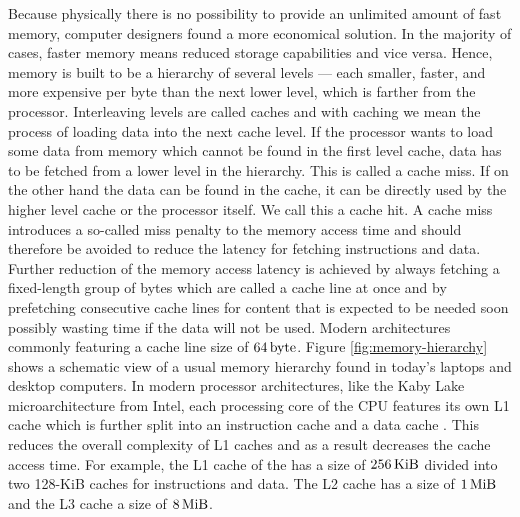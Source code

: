 \documentclass{stdlocal}
\begin{document}
    Because physically there is no possibility to provide an unlimited amount of fast memory, computer designers found a more economical solution.
    In the majority of cases, faster memory means reduced storage capabilities and vice versa.
    Hence, memory is built to be a hierarchy of several levels --- each smaller, faster, and more expensive per byte than the next lower level, which is farther from the processor.
    Interleaving levels are called caches and with caching we mean the process of loading data into the next cache level.
    If the processor wants to load some data from memory which cannot be found in the first level cache, data has to be fetched from a lower level in the hierarchy.
    This is called a cache miss.
    If on the other hand the data can be found in the cache, it can be directly used by the higher level cache or the processor itself.
    We call this a cache hit.
    A cache miss introduces a so-called miss penalty to the memory access time and should therefore be avoided to reduce the latency for fetching instructions and data.
    Further reduction of the memory access latency is achieved by always fetching a fixed-length group of bytes which are called a cache line at once and by prefetching consecutive cache lines for content that is expected to be needed soon possibly wasting time if the data will not be used.
    Modern architectures commonly featuring a cache line size of $64\, \mathrm{byte}$.
    Figure \ref{fig:memory-hierarchy} shows a schematic view of a usual memory hierarchy found in today's laptops and desktop computers.
    In modern processor architectures, like the Kaby Lake microarchitecture from Intel, each processing core of the CPU features its own L1 cache which is further split into an instruction cache and a data cache \autocite{intel-kaby-lake}.
    This reduces the overall complexity of L1 caches and as a result decreases the cache access time.
    For example, the L1 cache of the  has a size of $256\, \mathrm{KiB}$ divided into two 128-KiB caches for instructions and data.
    The L2 cache has a size of $1\, \mathrm{MiB}$ and the L3 cache a size of $8\, \mathrm{MiB}$.
    \autocites[\ppno~78-83]{hennessy2019}{intel-kaby-lake-i7}{intel-kaby-lake}
\end{document}
